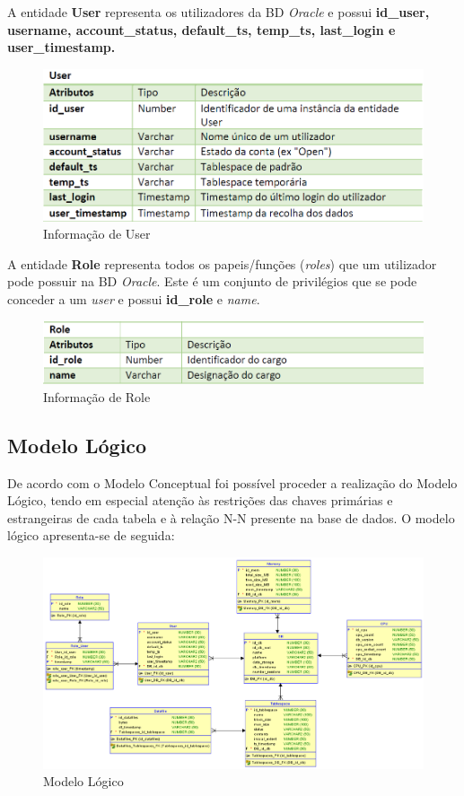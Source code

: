 \documentclass[a4paper]{article}
\begin{document}
\newpage

A entidade \textbf{User} representa os utilizadores da BD \emph{Oracle} e possui \textbf{id\_user, username, account\_status, default\_ts, temp\_ts, last\_login e user\_timestamp.}

\begin{figure}[H]
\centering
\includegraphics[scale=0.65]{user.PNG}
\caption{Informação de User}
\end{figure}

A entidade \textbf{Role} representa todos os papeis/funções (\emph{roles}) que um utilizador pode possuir na BD \emph{Oracle}. Este é um conjunto de privilégios que se pode conceder a um \emph{user} e possui \textbf{id\_role} e \emph{name}.

\begin{figure}[H]
\centering
\includegraphics[scale=0.65]{role.PNG}
\caption{Informação de Role}
\end{figure}


\newpage
\subsection{Modelo Lógico}
\hspace{3mm} 

De acordo com o Modelo Conceptual foi possível proceder a realização do Modelo Lógico, tendo em especial atenção às restrições das chaves primárias e estrangeiras de cada tabela e à relação N-N presente na base de dados. O modelo lógico apresenta-se de seguida:

\begin{figure}[H]
\centering
\includegraphics[scale=0.6]{modelo_logico.png}
\caption{Modelo Lógico}
\end{figure}
\end{document}
